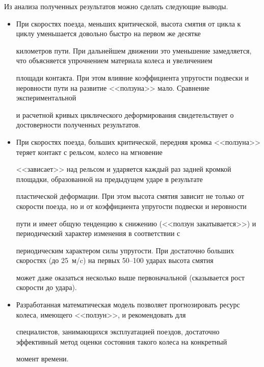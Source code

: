 \clearpage

Из анализа полученных результатов можно сделать следующие выводы.



\begin{itemize}

\item[1.] При скоростях поезда, меньших критической, высота смятия от цикла к циклу уменьшается довольно быстро на первом же десятке

километров пути. При дальнейшем движении это уменьшение замедляется, что объясняется упрочнением материала колеса и увеличением

площади контакта. При этом влияние коэффициента упругости подвески и неровности пути на развитие <<ползуна>> мало. Сравнение экспериментальной

и расчетной кривых циклического деформирования свидетельствует о достоверности полученных результатов.



\item[2.] При скоростях поезда, больших критической, передняя кромка <<ползуна>> теряет контакт с рельсом, колесо на мгновение

<<зависает>> над рельсом и ударяется каждый раз задней кромкой площадки, образованной на предыдущем ударе в результате

пластической деформации. При этом высота смятия зависит не только от скорости поезда, но и от коэффициента упругости подвески и неровности

пути и имеет общую тенденцию к снижению (<<ползун закатывается>>) и периодический характер изменения в соответствии с

периодическим характером силы упругости. При достаточно больших скоростях (до 25~м/c) на первых 50--100 ударах высота смятия

может даже оказаться несколько выше первоначальной (сказывается рост скорости до удара).



\item[3.] Разработанная математическая модель позволяет прогнозировать ресурс колеса, имеющего <<ползун>>, и рекомендовать для

специалистов, занимающихся эксплуатацией поездов, достаточно эффективный метод оценки состояния такого колеса на конкретный

момент времени.

\end{itemize}



